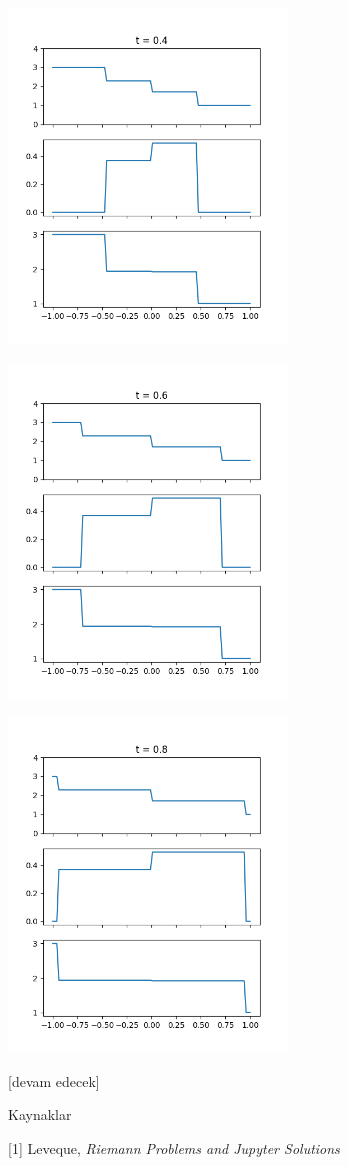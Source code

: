 \documentclass[12pt,fleqn]{article}\usepackage{../../common}
\begin{document}
\includegraphics[width=20em]{euler-roe-40.png}

\includegraphics[width=20em]{euler-roe-60.png}

\includegraphics[width=20em]{euler-roe-80.png}












[devam edecek]


Kaynaklar

[1] Leveque, {\em Riemann Problems and Jupyter Solutions}
\end{document}
